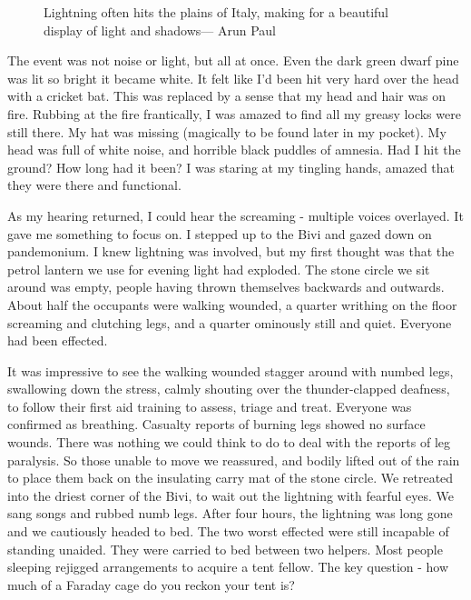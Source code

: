 \begin{figure*}[t!]
\checkoddpage \ifoddpage \forcerectofloat \else \forceversofloat \fi
\centering
{}
\caption{Lightning often hits the plains of Italy, making for a beautiful display of light and shadows--- Arun Paul}
\label{lightning}
\end{figure*}


The event was not noise or light, but all at once.  Even the dark green dwarf pine was lit so bright it became white. It felt like I'd been hit very hard over the head with a cricket bat. This was replaced by a sense that my head and hair was on fire. Rubbing at the fire frantically, I was amazed to find all my greasy locks were still there. My hat was missing (magically to be found later in my pocket). My head was full of white noise, and horrible black puddles of amnesia. Had I hit the ground? How long had it been? I was staring at my tingling hands, amazed that they were there and functional. 

As my hearing returned, I could hear the screaming - multiple voices overlayed. It gave me something to focus on. I stepped up to the Bivi and gazed down on pandemonium. I knew lightning was involved, but my first thought was that the petrol lantern we use for evening light had exploded. The stone circle we sit around was empty, people having thrown themselves backwards and outwards. About half the occupants were walking wounded, a quarter writhing on the floor screaming and clutching legs, and a quarter ominously still and quiet. Everyone had been effected.

It was impressive to see the walking wounded stagger around with numbed legs, swallowing down the stress, calmly shouting over the thunder-clapped deafness, to follow their first aid training to assess, triage and treat. Everyone was confirmed as breathing. Casualty reports of burning legs showed no surface wounds. There was nothing we could think to do to deal with the reports of leg paralysis. So those unable to move we reassured, and bodily lifted out of the rain to place them back on the insulating carry mat of the stone circle. We retreated into the driest corner of the Bivi, to wait out the lightning with fearful eyes. We sang songs and rubbed numb legs. After four hours, the lightning was long gone and we cautiously headed to bed. The two worst effected were still incapable of standing unaided. They were carried to bed between two helpers. Most people sleeping rejigged arrangements to acquire a tent fellow. The key question - how much of a Faraday cage do you reckon your tent is?

